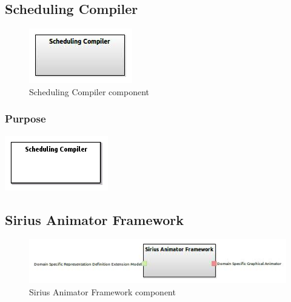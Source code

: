 \documentclass{gemoc} %
\begin{document}
\subsection{Scheduling Compiler}

\begin{figure}[htp]
	\begin{center}
	\includegraphics*[trim=0.0cm 0.0cm 0cm 0.0cm, clip=true, scale=1.0]{../images/generated/Generated_Scheduling Compiler.jpg}
	\caption{Scheduling Compiler component}
	\end{center}
\end{figure}

\subsubsection{Purpose}

\begin{center}
\includegraphics*[trim=0.0cm 0.0cm 0cm 0.0cm, clip=true]{../images/generated/Generated_Scheduling_Compiler.png}
\end{center}



\subsection{Sirius Animator Framework}

\begin{figure}[htp]
	\begin{center}
	\includegraphics*[trim=0.0cm 0.0cm 0cm 0.0cm, clip=true, scale=1.0]{../images/generated/Generated_Sirius Animator Framework.jpg}
	\caption{Sirius Animator Framework component}
	\end{center}
\end{figure}
\end{document}
